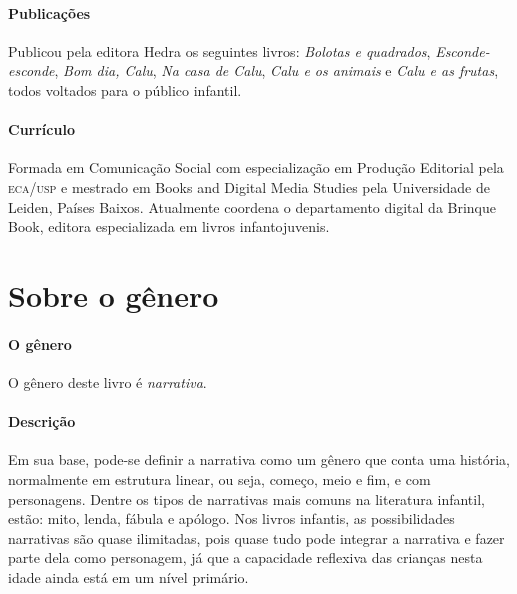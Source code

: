 \documentclass[11pt]{extarticle}
\begin{document}
\paragraph{Publicações}
Publicou pela editora Hedra os seguintes livros: \emph{Bolotas e quadrados},
\emph{Esconde-esconde}, \emph{Bom dia, Calu}, \emph{Na casa de Calu}, \emph{Calu e os animais} e
\emph{Calu e as frutas}, todos voltados para o público infantil.

\paragraph{Currículo} 
Formada em Comunicação Social com 
especialização em Produção Editorial pela \textsc{eca/usp} 
e mestrado em Books and Digital Media Studies pela 
Universidade de Leiden, Países Baixos.
Atualmente coordena o departamento digital da Brinque 
Book, editora especializada em livros infantojuvenis.


\section{Sobre o gênero}

\paragraph{O gênero} O gênero deste livro é \textit{narrativa}. 


\paragraph{Descrição} Em sua base, pode-se definir a narrativa como um gênero que conta uma história, normalmente em estrutura linear, ou seja, começo, meio e fim, e com personagens. 
Dentre os tipos de narrativas mais comuns na literatura infantil, estão: mito, lenda, 
fábula e apólogo. Nos livros infantis, as possibilidades narrativas são quase ilimitadas, pois quase tudo pode integrar a narrativa e fazer parte dela como personagem, já que a capacidade reflexiva das crianças nesta idade ainda está em um nível primário. 



\end{document}
